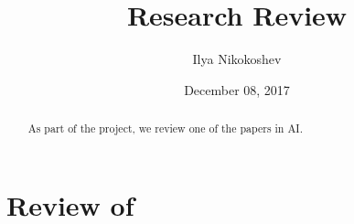 \documentclass[oneside]{article}   	%
\title{Research Review}
\author{Ilya Nikokoshev}
\date{December 08, 2017}
\begin{document}
\maketitle

\begin{abstract}
As part of the project, we review one of the papers in AI.
\end{abstract}

\section{Review of \cite{Silver_2016}}




\end{document}
